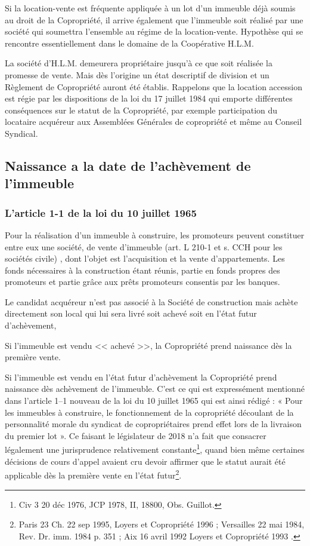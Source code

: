 			Si la location-vente est fréquente appliquée à un lot d'un immeuble déjà soumis au droit de la Copropriété, il arrive également que l'immeuble soit réalisé par une société qui soumettra l'ensemble au régime de la location-vente. Hypothèse qui se rencontre essentiellement dans le domaine de la Coopérative H.L.M.
			
			La société d'H.L.M. demeurera propriétaire jusqu'à ce que soit réalisée la promesse de vente. Mais dès l'origine un état descriptif de division et un Règlement de Copropriété auront été établis. Rappelons que la location accession est régie par les dispositions de la loi du 17 juillet 1984 qui emporte différentes conséquences sur le statut de la Copropriété, par exemple participation du locataire acquéreur aux Assemblées Générales de copropriété et même au Conseil Syndical.
			
	\subsection{Naissance a la date de l’achèvement de l’immeuble}
	
		\subsubsection{L’article 1\ier{}-1 de la loi du 10 juillet 1965}
	
			Pour la réalisation d’un immeuble à construire, les promoteurs peuvent constituer entre eux une société, de vente d'immeuble (art. L 210-1 et s. CCH pour les sociétés civile) , dont l'objet est l'acquisition et la
			vente d'appartements. Les fonds nécessaires à la construction étant réunis, partie en fonds propres des promoteurs et partie grâce aux prêts promoteurs consentis par les banques.
			
			Le candidat acquéreur n'est pas associé à la Société de construction mais achète directement son local qui lui sera livré soit achevé soit en l'état futur d'achèvement,
			
			Si l'immeuble est vendu << achevé >>, la Copropriété prend naissance dès la première vente.
			
			Si l'immeuble est vendu en l'état futur d'achèvement la Copropriété prend naissance dès achèvement de l'immeuble.
			C’est ce qui est expressément mentionné dans l’article 1\ier{}–1 nouveau de la loi du 10 juillet 1965 qui est ainsi rédigé :
			« Pour les immeubles à construire, le fonctionnement de la copropriété découlant de la personnalité morale du syndicat de copropriétaires prend effet lors de la livraison du premier lot ».
			Ce faisant le législateur de 2018 n’a fait que consacrer légalement une jurisprudence relativement constante\footnote{Civ 3\degre{} 20 déc 1976, JCP 1978, II, 18800, Obs. Guillot.}, quand bien même certaines décisions de cours d’appel avaient cru devoir affirmer que le statut aurait été applicable dès la première vente en l’état futur\footnote{Paris 23\degre{} Ch. 22 sep 1995, Loyers et Copropriété 1996  ; Versailles 22 mai 1984, Rev. Dr. imm. 1984 p. 351 ; Aix 16 avril 1992 Loyers et Copropriété 1993 .}.
	
